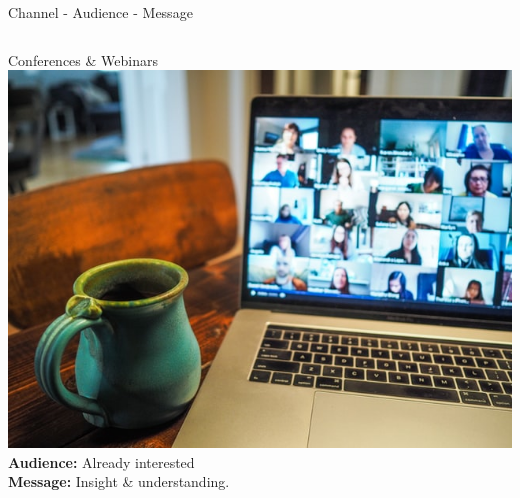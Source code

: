 \begin{frame}{Channel - Audience - Message}
\begin{columns}
    \begin{column}{0.3\textwidth}
        \begin{block}{Conferences \& Webinars}
        \centering
            \includegraphics[width=\textwidth]{images/chris-montgomery-smgTvepind4-unsplash.jpg}
            {\small
            \textbf{Audience:} Already interested\\
            \textbf{Message:} Insight \& understanding. %
            }
        \end{block}
    \end{column}
    

\end{columns}
\end{frame}
